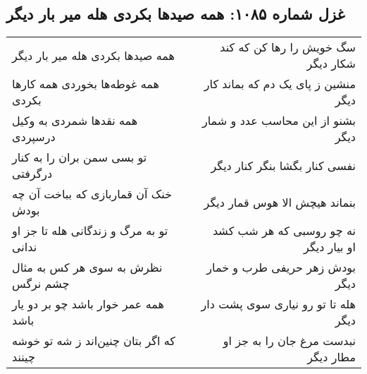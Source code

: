 \begin{center}
\section*{غزل شماره ۱۰۸۵: همه صیدها بکردی هله میر بار دیگر}
\label{sec:1085}
\begin{longtable}{l p{0.5cm} r}
همه صیدها بکردی هله میر بار دیگر
&&
سگ خویش را رها کن که کند شکار دیگر
\\
همه غوطه‌ها بخوردی همه کارها بکردی
&&
منشین ز پای یک دم که بماند کار دیگر
\\
همه نقدها شمردی به وکیل درسپردی
&&
بشنو از این محاسب عدد و شمار دیگر
\\
تو بسی سمن بران را به کنار درگرفتی
&&
نفسی کنار بگشا بنگر کنار دیگر
\\
خنک آن قماربازی که بباخت آن چه بودش
&&
بنماند هیچش الا هوس قمار دیگر
\\
تو به مرگ و زندگانی هله تا جز او ندانی
&&
نه چو روسبی که هر شب کشد او بیار دیگر
\\
نظرش به سوی هر کس به مثال چشم نرگس
&&
بودش زهر حریفی طرب و خمار دیگر
\\
همه عمر خوار باشد چو بر دو یار باشد
&&
هله تا تو رو نیاری سوی پشت دار دیگر
\\
که اگر بتان چنین‌اند ز شه تو خوشه چینند
&&
نبدست مرغ جان را به جز او مطار دیگر
\\
\end{longtable}
\end{center}
